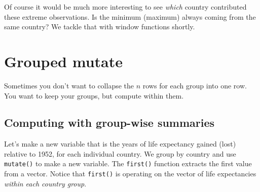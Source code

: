 \documentclass[
]{book}
\newenvironment{Shaded}{\begin{snugshade}}{\end{snugshade}}
\newcommand{\CommentTok}[1]{\textcolor[rgb]{0.56,0.35,0.01}{\textit{#1}}}
\newcommand{\DataTypeTok}[1]{\textcolor[rgb]{0.13,0.29,0.53}{#1}}
\newcommand{\KeywordTok}[1]{\textcolor[rgb]{0.13,0.29,0.53}{\textbf{#1}}}
\newcommand{\NormalTok}[1]{#1}
\newcommand{\OperatorTok}[1]{\textcolor[rgb]{0.81,0.36,0.00}{\textbf{#1}}}
\newcommand{\StringTok}[1]{\textcolor[rgb]{0.31,0.60,0.02}{#1}}
\begin{document}
\begin{Shaded}
\end{Shaded}

Of course it would be much more interesting to see \emph{which} country contributed these extreme observations. Is the minimum (maximum) always coming from the same country? We tackle that with window functions shortly.

\hypertarget{grouped-mutate}{%
\section{Grouped mutate}\label{grouped-mutate}}

Sometimes you don't want to collapse the \(n\) rows for each group into one row. You want to keep your groups, but compute within them.

\hypertarget{computing-with-group-wise-summaries}{%
\subsection{Computing with group-wise summaries}\label{computing-with-group-wise-summaries}}

Let's make a new variable that is the years of life expectancy gained (lost) relative to 1952, for each individual country. We group by country and use \texttt{mutate()} to make a new variable. The \texttt{first()} function extracts the first value from a vector. Notice that \texttt{first()} is operating on the vector of life expectancies \emph{within each country group}.
\end{document}
